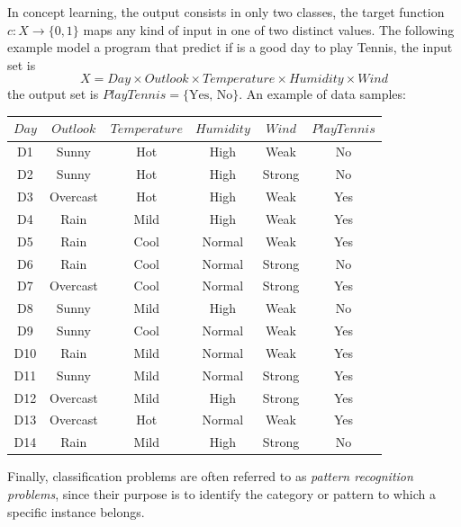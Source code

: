 \documentclass[10pt, letterpaper]{report}
\begin{document}
In concept learning, the output consists in only two classes, the target function $c:X\rightarrow\{0,1\}$ maps  any kind of input in one of two distinct values. The following example model a program that predict if is a good day to play Tennis, the input set is $$
	X=Day\times Outlook \times Temperature \times Humidity \times Wind
$$
the output set is $PlayTennis=\{\text{Yes, No}\}$. An example of data samples:\begin{center}
	\begin{tabular}{cccccc}
		\toprule
		$Day$ & $Outlook$ & $Temperature$ & $Humidity$ & $Wind$ & $PlayTennis$ \\
		\midrule
		D1    & Sunny     & Hot           & High       & Weak   & No           \\
		D2    & Sunny     & Hot           & High       & Strong & No           \\
		D3    & Overcast  & Hot           & High       & Weak   & Yes          \\
		D4    & Rain      & Mild          & High       & Weak   & Yes          \\
		D5    & Rain      & Cool          & Normal     & Weak   & Yes          \\
		D6    & Rain      & Cool          & Normal     & Strong & No           \\
		D7    & Overcast  & Cool          & Normal     & Strong & Yes          \\
		D8    & Sunny     & Mild          & High       & Weak   & No           \\
		D9    & Sunny     & Cool          & Normal     & Weak   & Yes          \\
		D10   & Rain      & Mild          & Normal     & Weak   & Yes          \\
		D11   & Sunny     & Mild          & Normal     & Strong & Yes          \\
		D12   & Overcast  & Mild          & High       & Strong & Yes          \\
		D13   & Overcast  & Hot           & Normal     & Weak   & Yes          \\
		D14   & Rain      & Mild          & High       & Strong & No           \\
		\bottomrule
	\end{tabular}
\end{center}

\newpage
\bigskip
Finally, classification problems are often referred to as \textit{pattern recognition problems}, since their purpose is to identify the category or pattern to which a specific instance belongs.
\end{document}
